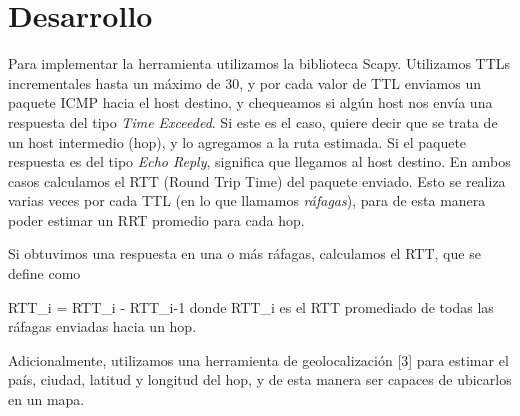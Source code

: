 \section{Desarrollo}

Para implementar la herramienta utilizamos la biblioteca Scapy. Utilizamos TTLs incrementales hasta un máximo de 30, y por cada valor de TTL enviamos un paquete ICMP hacia el host destino, y chequeamos si algún host nos envía una respuesta del tipo \textit{Time Exceeded}. Si este es el caso, quiere decir que se trata de un host intermedio (hop), y lo agregamos a la ruta estimada. Si el paquete respuesta es del tipo \textit{Echo Reply}, significa que llegamos al host destino. En ambos casos calculamos el RTT (Round Trip Time) del paquete enviado. Esto se realiza varias veces por cada TTL (en lo que llamamos \textit{ráfagas}), para de esta manera poder estimar un RRT promedio para cada hop.

Si obtuvimos una respuesta en una o más ráfagas, calculamos el \delta RTT, que se define como

\delta RTT_{i} = RTT_{i} - RTT_{i-1} donde RTT_{i} es el RTT promediado de todas las ráfagas enviadas hacia un hop.

Adicionalmente, utilizamos una herramienta de geolocalización [3] para estimar el país, ciudad, latitud y longitud del hop, y de esta manera ser capaces de ubicarlos en un mapa.
